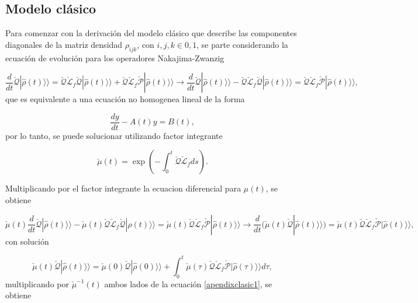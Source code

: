 \begin{appendixs}
\label{appendix5final}

\subsection{Modelo clásico}
Para comenzar con la derivación del modelo clásico que describe las componentes diagonales de la matriz densidad $\rho_{ijk}$, con $i,j,k \in {0,1}$, se parte considerando la ecuación de evolución para los operadores Nakajima-Zwanzig

\begin{equation*}
    \frac{d}{dt}\check{\mathcal{Q}}|\hat{\rho}(t)\rangle \rangle = \check{\mathcal{Q}}\check{\mathcal{L}}_{f}\check{\mathcal{Q}}|\hat{\rho}(t)\rangle \rangle + \check{\mathcal{Q}}\check{\mathcal{L}}_{f}\check{\mathcal{P}}|\hat{\rho}(t)\rangle \rangle \to \frac{d}{dt}\check{\mathcal{Q}}|\hat{\rho}(t)\rangle \rangle - \check{\mathcal{Q}}\check{\mathcal{L}}_{f}\check{\mathcal{Q}}|\hat{\rho}(t)\rangle \rangle = \check{\mathcal{Q}}\check{\mathcal{L}}_{f}\check{\mathcal{P}}|\hat{\rho}(t)\rangle \rangle ,
\end{equation*}
que es equivalente a una ecuación no homogenea lineal de la forma

\begin{equation*}
    \frac{dy}{dt} - A(t)y = B(t),
\end{equation*}
por lo tanto, se puede solucionar utilizando factor integrante

\begin{equation*}
    \check{\mu}(t) = \exp\left( - \int_{0}^{t}\check{\mathcal{Q}}\check{\mathcal{L}}_{f}ds \right).
\end{equation*}

Multiplicando por el factor integrante la ecuacion diferencial para $\mu(t)$, se obtiene 

\begin{equation*}
    \check{\mu}(t)\frac{d}{dt}\check{\mathcal{Q}}|\hat{\rho}(t)\rangle \rangle - \check{\mu}(t)\check{\mathcal{Q}}\check{\mathcal{L}}_{f}\check{\mathcal{Q}}|\hat{\rho}(t)\rangle \rangle  = \check{\mu}(t)\check{\mathcal{Q}}\check{\mathcal{L}}_{f}\check{\mathcal{P}}|\hat{\rho}(t)\rangle \rangle  \to \frac{d}{dt}(\check{\mu}(t)\check{\mathcal{Q}}|\hat{\rho}(t)\rangle \rangle) = \check{\mu}(t)\check{\mathcal{Q}}\check{\mathcal{L}}_{f}\check{\mathcal{P}}|\hat{\rho}(t)\rangle \rangle ,
\end{equation*}
con solución

\begin{equation}
    \check{\mu}(t)\check{\mathcal{Q}}|\hat{\rho}(t)\rangle \rangle  = \check{\mu}(0)\check{\mathcal{Q}}|\hat{\rho}(0)\rangle \rangle  + \int_{0}^{t}\check{\mu}(\tau)\check{\mathcal{Q}}\check{\mathcal{L}}_{f} \check{\mathcal{P}}|\hat{\rho}(\tau)\rangle \rangle d\tau,  
    \label{apendixclasic1} 
\end{equation}
multiplicando por $\check{\mu}^{-1}(t)$ ambos lados de la ecuación \ref{apendixclasic1}, se obtiene


\end{appendixs}
